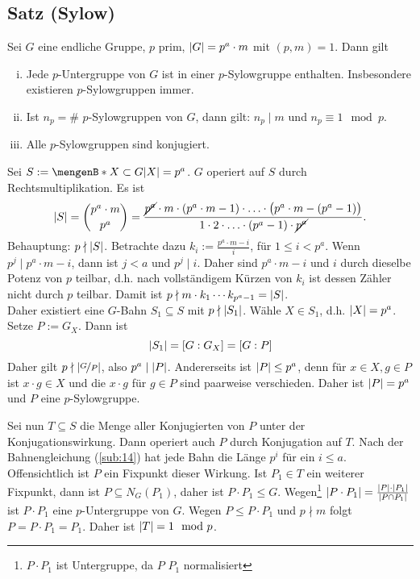 \subsection{Satz (Sylow)} %
\label{sub:18}
Sei $G$ eine endliche Gruppe, $p$ prim, $\abs*{G} = p^a \cdot m $ mit $(p,m) = 1$. Dann gilt
\begin{enumerate}[(i)]
	\item Jede $p$-Untergruppe von $G$ ist in einer $p$-Sylowgruppe enthalten. Insbesondere existieren $p$-Sylowgruppen immer.
	\item Ist $n_p = \#$ $p$-Sylowgruppen von $G$, dann gilt: $n_p \mid m$ und $n_p \equiv 1 \mod p$.
	\item Alle $p$-Sylowgruppen sind konjugiert.
\end{enumerate}
Sei $S := \set[X \subset G]{ \abs*{X} = p^a } $. $G$ operiert auf $S$ durch Rechtsmultiplikation. Es ist
\[
	\abs*{S} = \binom{p^a \cdot m}{p^a} = \frac{\cancel{p^a} \cdot m \cdot  (p^a \cdot m -1) \cdot \ldots \cdot \big(p^a \cdot m - (p^a -1)\big)}{1 \cdot 2 \cdot \ldots 
	\cdot (p^a -1) \cdot \cancel{p^a}}.  
\]
Behauptung: $p \nmid \abs*{S} $. Betrachte dazu $k_i := \frac{p^a \cdot m -i}{i}$, für $1 \le i < p^a$. Wenn $p^j \mid p^a \cdot m -i$, dann ist $j < a$ und $p^j \mid i$.
Daher sind $p^a \cdot m -i$ und $i$ durch dieselbe Potenz von $p$ teilbar, d.h. nach vollständigem Kürzen von $k_i$ ist dessen Zähler nicht durch $p$ teilbar. Damit ist $p \nmid m \cdot k_1 \cdots k_{p^a-1} = \abs*{S}$.\\
Daher existiert eine $G$-Bahn $S_1 \subseteq S$ mit $p \nmid \abs*{S_1} $. Wähle $X \in S_1$, d.h. $\abs*{X}= p^a$. Setze $P := G_X$. Dann ist 
\[
	\abs*{S_1} = [G: G_X] = [G: P] 
\]
Daher gilt $p \nmid \abs*{\nicefrac{G}{P}}$, also $p^a \mid \abs*{P}$. Andererseits ist $\abs*{P} \le p^a$, denn für $x \in X, g \in P$ ist $x \cdot g \in X$ und die 
$x \cdot g$ für $g \in P$ sind paarweise verschieden. Daher ist $\abs*{P} = p^a $ und $P$ eine $p$-Sylowgruppe. 

Sei nun $T \subseteq S$ die Menge aller Konjugierten von $P$ unter der Konjugationswirkung. Dann operiert auch $P$ durch Konjugation auf $T$. Nach der Bahnengleichung
(\ref{sub:14}) hat 
jede Bahn die Länge $p^i$ für ein $i \le a$. Offensichtlich ist $P$ ein Fixpunkt dieser Wirkung. Ist $P_1 \in T$ ein weiterer Fixpunkt, dann ist 
$P \subseteq N_G(P_1)$, daher ist $P \cdot  P_1 \le G$. Wegen\footnote{$P \cdot P_1$ ist Untergruppe, da $P$ $P_1$ normalisiert} 
$\abs*{P \cdot P_1} = \frac{\abs*{P} \cdot \abs*{P_1}}{\abs*{P \cap P_1} }$ ist $P \cdot P_1$ eine $p$-Untergruppe von $G$. Wegen $P \le P \cdot P_1$ und $p \nmid m$ folgt
$P= P \cdot P_1 = P_1$. Daher ist $\abs*{T} = 1 \mod p $. 

